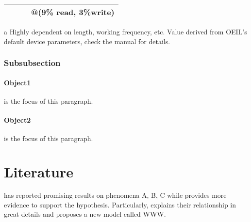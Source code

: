 \documentclass[\projectroot/template.tex]{subfiles}
\begin{document}
\begin{table}[!htb]
\begin{adjustbox}{max width=\textwidth}
\begin{threeparttable}
\begin{tabular}{l r r r}
				&                           &                                 & @(9\% read, 3\%write)          \\ \bottomrule
			\end{tabular}
			\begin{tablenotes}
				\newcommand{\CORNERSTONE}{\href{run:./appendix/CORNERSTONE-Standard-Components-Library-SOI.pdf}{CORNERSTONE}}
				\scriptsize
				\item [a] Highly dependent on length, working frequency, etc. Value derived from OEIL's default device parameters, check the manual for details.
			\end{tablenotes}
		\end{threeparttable}
	\end{adjustbox}
\end{table}

\subsubsection{Subsubsection}

\paragraph{Object1} is the focus of this paragraph. \blindtext

\paragraph{Object2} is the focus of this paragraph. \blindtext

\section{Literature}

\cite{A, B, G} has reported promising results on phenomena A, B, C while \cite{G} provides more evidence to support the hypothesis. Particularly, \citep[Sec.~III]{G} explains their relationship in great details and proposes a new model called WWW.
\end{document}
